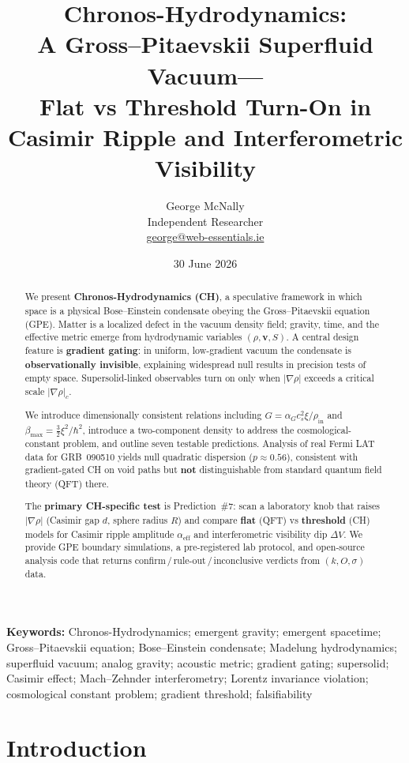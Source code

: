 \documentclass[11pt,a4paper]{article}
\title{%
  Chronos-Hydrodynamics:\\
  A Gross--Pitaevskii Superfluid Vacuum---\\
  Flat vs Threshold Turn-On in Casimir Ripple and Interferometric Visibility%
}
\author{%
  George McNally\\[0.25em]
  \small Independent Researcher\\[0.15em]
  \small \href{mailto:george@web-essentials.ie}{george@web-essentials.ie}%
}
\date{30 June 2026}
\begin{document}
\maketitle

\begin{abstract}
We present \textbf{Chronos-Hydrodynamics (CH)}, a speculative framework in which space is a physical Bose--Einstein condensate obeying the Gross--Pitaevskii equation (GPE).
Matter is a localized defect in the vacuum density field; gravity, time, and the effective metric emerge from hydrodynamic variables $(\rho, \mathbf{v}, S)$.
A central design feature is \textbf{gradient gating}: in uniform, low-gradient vacuum the condensate is \textbf{observationally invisible}, explaining widespread null results in precision tests of empty space.
Supersolid-linked observables turn on only when $|\nabla\rho|$ exceeds a critical scale $|\nabla\rho|_c$.

We introduce dimensionally consistent relations including $G = \alpha_G c_s^2 \xi / \rho_{\mathrm{in}}$ and $\beta_{\max} = \tfrac{3}{2}\xi^2/\hbar^2$, introduce a two-component density to address the cosmological-constant problem, and outline seven testable predictions.
Analysis of real Fermi LAT data for GRB~090510 yields null quadratic dispersion ($p \approx 0.56$), consistent with gradient-gated CH on void paths but \textbf{not} distinguishable from standard quantum field theory (QFT) there.

The \textbf{primary CH-specific test} is Prediction~\#7: scan a laboratory knob that raises $|\nabla\rho|$ (Casimir gap $d$, sphere radius $R$) and compare \textbf{flat} (QFT) vs \textbf{threshold} (CH) models for Casimir ripple amplitude $\alpha_{\mathrm{eff}}$ and interferometric visibility dip $\Delta V$.
We provide GPE boundary simulations, a pre-registered lab protocol, and open-source analysis code that returns confirm\,/\,rule-out\,/\,inconclusive verdicts from $(k, O, \sigma)$ data.
\end{abstract}

\noindent\textbf{Keywords:} Chronos-Hydrodynamics; emergent gravity; emergent spacetime; Gross--Pitaevskii equation; Bose--Einstein condensate; Madelung hydrodynamics; superfluid vacuum; analog gravity; acoustic metric; gradient gating; supersolid; Casimir effect; Mach--Zehnder interferometry; Lorentz invariance violation; cosmological constant problem; gradient threshold; falsifiability

\section{Introduction}
\label{sec:intro}
\end{document}
